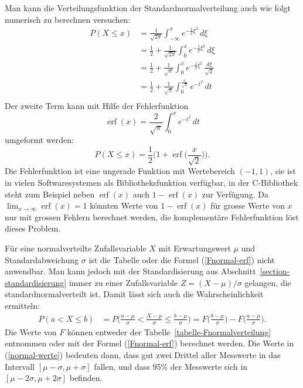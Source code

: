 Man kann die Verteilungsfunktion der Standardnormalverteilung auch wie folgt
numerisch zu berechnen versuchen:
\begin{equation}
\begin{aligned}
P(X\le x)
&=\frac1{\sqrt{2\pi}}\int_{-\infty}^xe^{-\frac12\xi^2}\,d\xi\\
&=\frac12+\frac1{\sqrt{2\pi}}\int_0^xe^{-\frac12\xi^2}\,d\xi\\
&=\frac12+\frac1{\sqrt{\pi}}\int_0^xe^{-\frac12\xi^2}\,\frac{d\xi}{\sqrt{2}}\\
&=\frac12+\frac1{\sqrt{\pi}}\int_0^{\frac{x}{\sqrt{2}}}e^{-t^2}\,dt\\
\end{aligned}
\label{normal-werte}
\end{equation}
Der zweite Term kann mit Hilfe der Fehlerfunktion 
\[
\operatorname{erf}(x)=\frac{2}{\sqrt{\pi}}\int_0^xe^{-t^2}\,dt
\]
umgeformt werden:
\begin{equation}
P(X\le x)=\frac12\biggl(1+\operatorname{erf}\biggl(\frac{x}{\sqrt{2}}\biggr)\biggr).
\label{Fnormal-erf}
\end{equation}
%
%
Die Fehlerfunktion ist eine ungerade Funktion mit Wertebereich $(-1,1)$,
sie ist in vielen Softwaresystemen als Bibliotheksfunktion verfügbar, in
der C-Bibliothek steht zum Beispiel neben $\operatorname{erf}(x)$ auch
$1-\operatorname{erf}(x)$ zur Verfügung.
Da $\lim_{x\to\infty}\operatorname{erf}(x)=1$ könnten Werte von
$1-\operatorname{erf}(x)$ für grosse Werte von $x$ nur mit grossen Fehlern 
berechnet werden, die komplementäre Fehlerfunktion löst dieses Problem.

Für eine normalverteilte Zufallsvariable $X$ mit Erwartungswert $\mu$ und
Standardabweichung $\sigma$ ist die Tabelle oder die Formel (\ref{Fnormal-erf})
nicht anwendbar. 
Man kann jedoch mit der Standardisierung aus Abschnitt~\ref{section-standardisierung}
immer zu einer Zufallsvariable $Z=(X-\mu)/\sigma$ gelangen, die
standardnormalverteilt ist.
Damit lässt sich auch die Wahrscheinlichkeit ermitteln:
\begin{align*}
P(a<X\le b)
&=
P\biggl(\frac{a-\mu}{\sigma}<\frac{X-\mu}{\sigma}\le \frac{b-\mu}{\sigma}\biggr)
=
F\biggl(\frac{b-\mu}{\sigma}\biggr)
-
F\biggl(\frac{a-\mu}{\sigma}\biggr).
\end{align*}
Die Werte von $F$ können entweder der Tabelle~\ref{tabelle-Fnormalverteilung}
entnommen oder mit der Formel (\ref{Fnormal-erf}) berechnet werden.
Die Werte in (\ref{normal-werte}) bedeuten dann, dass gut zwei Drittel aller
Messwerte in das Intervall $[\mu-\sigma, \mu+\sigma]$ fallen, und dass 
95\% der Messwerte sich in $[\mu-2\sigma,\mu+2\sigma]$ befinden.

